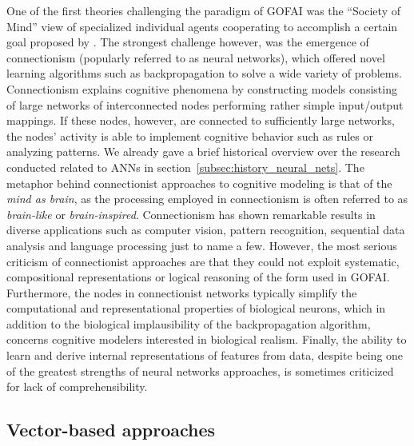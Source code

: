 One of the first theories challenging the paradigm of \ac{GOFAI} was the \enquote{Society of Mind} view of specialized individual agents cooperating to accomplish a certain goal proposed by \textcite{Minsky1986}.
The strongest challenge however, was the emergence of connectionism \parencite{Rumelhart1986a} (popularly referred to as neural networks), which offered novel learning algorithms such as backpropagation \parencite{Rumelhart1986} to solve a wide variety of problems.
Connectionism explains cognitive phenomena by constructing models consisting of large networks of interconnected nodes performing rather simple input/output mappings.
If these nodes, however, are connected to sufficiently large networks, the nodes' activity is able to implement cognitive behavior such as rules or analyzing patterns.
We already gave a brief historical overview over the research conducted related to \acp{ANN} in section~\ref{subsec:history_neural_nets}. 
The metaphor behind connectionist approaches to cognitive modeling is that of the \emph{mind as brain}, as the processing employed in connectionism is often referred to as \emph{brain-like} or \emph{brain-inspired}.
Connectionism has shown remarkable results in diverse applications such as computer vision, pattern recognition, sequential data analysis and language processing just to name a few.
However, the most serious criticism of connectionist approaches are that they could not exploit systematic, compositional representations or logical reasoning of the form used in \ac{GOFAI}. 
Furthermore, the nodes in connectionist networks typically simplify the computational and representational properties of biological neurons, which in addition to the biological implausibility of the backpropagation algorithm, concerns cognitive modelers interested in biological realism.
Finally, the ability to learn and derive internal representations of features from data, despite being one of the greatest strengths of neural networks approaches, is sometimes criticized for lack of comprehensibility.

\subsection{Vector-based approaches}%
\label{subsec:vector_based_approaches}

